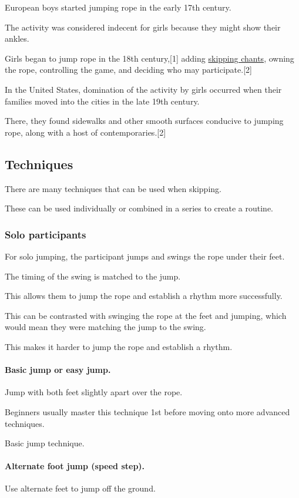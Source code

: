 \documentclass[oneside]{book}
\numberwithin{equation}{section}
\begin{document}
European boys started jumping rope in the early 17th century.

The activity was considered indecent for girls because they might show their ankles.

Girls began to jump rope in the 18th century,[1] adding \href{https://en.wikipedia.org/wiki/Skipping-rope_rhyme}{skipping chants}, owning the rope, controlling the game, and deciding who may participate.[2]

%
In the United States, domination of the activity by girls occurred when their families moved into the cities in the late 19th century.

There, they found sidewalks and other smooth surfaces conducive to jumping rope, along with a host of contemporaries.[2]

\subsection{Techniques}
There are many techniques that can be used when skipping.

These can be used individually or combined in a series to create a routine.

\subsubsection{Solo participants}
For solo jumping, the participant jumps and swings the rope under their feet.

The timing of the swing is matched to the jump.

This allows them to jump the rope and establish a rhythm more successfully.

This can be contrasted with swinging the rope at the feet and jumping, which would mean they were matching the jump to the swing.

This makes it harder to jump the rope and establish a rhythm.

\paragraph{Basic jump or easy jump.} Jump with both feet slightly apart over the rope.

Beginners usually master this technique 1st before moving onto more advanced techniques.

\textsf{Basic jump technique.}

\paragraph{Alternate foot jump (speed step).} Use alternate feet to jump off the ground.
\end{document}
